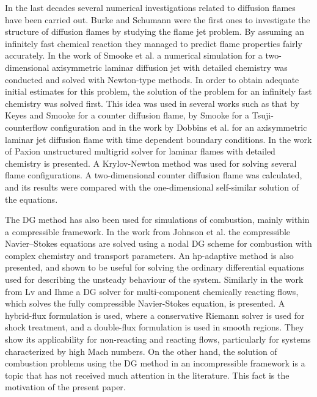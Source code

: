 In the last decades several numerical investigations related to diffusion flames have been carried out. Burke and Schumann were the first ones to investigate the structure of diffusion flames by studying the flame jet problem. \textcite{burkeDiffusionFlames1928} By assuming an infinitely fast chemical reaction they managed to predict flame properties fairly accurately. In the work of Smooke et al. \textcite{smookeNumericalSolutionTwoDimensional1986} a numerical simulation for a two-dimensional axisymmetric laminar diffusion jet  with detailed chemistry was conducted and solved with Newton-type methods. In order to obtain adequate initial estimates for this problem, the solution of the problem for an infinitely fast chemistry was solved first. This idea was used in several works such as that by Keyes and Smooke \textcite{keyesFlameSheetStarting1987} for a counter diffusion flame, by Smooke \textcite{smookeNumericalModelingAxisymmetric1992} for a Tsuji-counterflow configuration and in the work by Dobbins et al. \textcite{dobbinsFullyImplicitCompact2010} for an axisymmetric laminar jet diffusion flame with time dependent boundary conditions. In the work of Paxion \textcite{paxionDevelopmentParallelUnstructured2001} unstructured multigrid solver for laminar flames with detailed chemistry is presented. A Krylov-Newton method was used for solving several flame configurations. A two-dimensional counter diffusion flame was calculated, and its results were compared with the one-dimensional self-similar solution of the equations.

The DG method has also been used for simulations of combustion, mainly within a compressible framework. In the work from Johnson et al. \textcite{johnsonConservativeDiscontinuousGalerkin2020} the compressible Navier--Stokes equations are solved using a nodal DG scheme for combustion with complex chemistry and transport parameters. An hp-adaptive method is also presented, and shown to be useful for solving the ordinary differential equations used for describing the unsteady behaviour of the system.  Similarly in the work from Lv and Ihme \textcite{lvHighorderDiscontinuousGalerkin2017} a DG solver for multi-component chemically reacting flows, which solves the fully compressible Navier-Stokes equation, is presented. A hybrid-flux formulation is used, where a conservative Riemann solver is used for shock treatment, and a double-flux formulation is used in smooth regions. They show its applicability for non-reacting and reacting flows, particularly for systems characterized by high Mach numbers. On the other hand, the solution of combustion problems using the DG method in an incompressible framework is a topic that has not received much attention in the literature. This fact is the motivation of the present paper.

